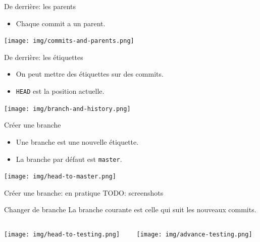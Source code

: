 \documentclass{beamer}
\begin{document}
\begin{frame}{De derrière: les parents}
    \begin{itemize}
        \item Chaque commit a un parent.
    \end{itemize}
    \texttt{[image: img/commits-and-parents.png]}
\end{frame}

\begin{frame}{De derrière: les étiquettes}
    \begin{itemize}
        \item On peut mettre des étiquettes sur des commits.
        \item \texttt{HEAD} est la position actuelle.
    \end{itemize}
    \texttt{[image: img/branch-and-history.png]}
\end{frame}

\begin{frame}{Créer une branche}
    \begin{itemize}
        \item Une branche est une nouvelle étiquette.
        \item La branche par défaut est \texttt{master}.
    \end{itemize}
    \begin{center}
        \texttt{[image: img/head-to-master.png]}
    \end{center}
\end{frame}

\begin{frame}{Créer une branche: en pratique}
    TODO: screenshots
\end{frame}

\begin{frame}{Changer de branche}
    La branche courante est celle qui suit les nouveaux commits.
    \begin{columns}
        \begin{column}{0.44\textwidth}
            \begin{center}
                \texttt{[image: img/head-to-testing.png]}
            \end{center}
        \end{column}
        \begin{column}{0.54\textwidth}
            \texttt{[image: img/advance-testing.png]}
        \end{column}
    \end{columns}
\end{frame}
\end{document}
